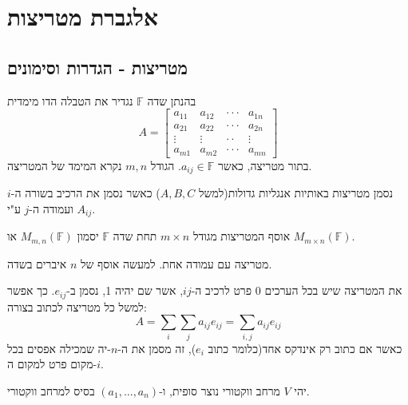 \documentclass{tstextbook}
\begin{document}
\section{אלגברת מטריצות}

\subsection{מטריצות - הגדרות וסימונים}

\begin{definition}
בהנתן שדה \(\mathbb{F}\) נגדיר את הטבלה הדו מימדית 
$$A=\begin{bmatrix}a_{11}&a_{12}&\cdot\cdot\cdot&a_{1n}\\ a_{21}&a_{22}&\cdot\cdot\cdot&a_{2n}\\ \vdots&\vdots&\cdot\cdot&\vdots\\ a_{m1}&a_{m2}&\cdot\cdot\cdot&a_{m n}\end{bmatrix}$$
בתור מטריצה, כאשר \(a_{ij}\in \mathbb{F}\). הגודל \(m,n\) נקרא המימד של המטריצה.

\end{definition}
\begin{symbolize}
נסמן מטריצות באותיות אנגליות גדולות(למשל \(A,B,C\)) כאשר נסמן את הרכיב בשורה ה-\(i\) ועמודה ה-\(j\) ע"י \(A_{ij}\). 

\end{symbolize}
\begin{symbolize}
אוסף המטריצות מגודל \(m\times n\) תחת שדה \(\mathbb{F}\) יסמון \(M_{m,n}\left( \mathbb{F} \right)\) או \(M_{m\times n}\left( \mathbb{F}  \right)\).

\end{symbolize}
\begin{definition}[n-יה]
מטריצה עם עמודה אחת. למעשה אוסף של \(n\) איברים בשדה.

\end{definition}
\begin{symbolize}
את המטריצה שיש בכל הערכים \(0\) פרט לרכיב ה-\(ij\), אשר שם יהיה 1, נסמן ב-\(e_{ij}\). כך אפשר למשל כל מטריצה לכתוב בצורה:
$$A=\sum_{i}\sum_{j}a_{ij}e_{ij}=\sum_{i,j}a_{ij}e_{ij}$$
כאשר אם כתוב רק אינדקס אחד(כלומר כתוב \(e_{i}\)), זה מסמן את ה-\(n\)-יה שמכילה אפסים בכל מקום פרט למקום ה-\(i\).

\end{symbolize}
\begin{definition}
יהי \(V\) מרחב ווקטורי נוצר סופית, ו-\(\left( a_{1},\dots,a_{n} \right)\) בסיס למרחב ווקטורי.

\end{definition}
\end{document}
